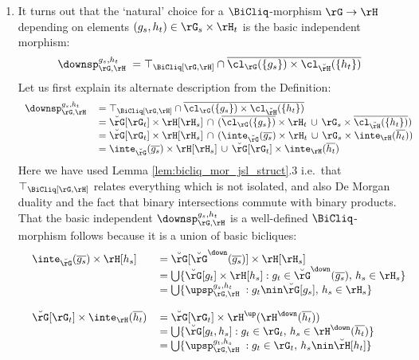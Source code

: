 \documentclass{article}
\begin{document}
\begin{example}
\begin{enumerate}
\item
It turns out that the `natural' choice for a $\BiCliq$-morphism $\rG \to \rH$ depending on elements $(g_s,h_t) \in \rG_s \times \rH_t$ is the basic independent morphism:
\[
\downsp_{\rG,\rH}^{g_s,h_t} \;
= \top_{\BiCliq[\rG,\rH]} \cap \overline{\cl_\rG(\{g_s\}) \times \cl_{\breve{\rH}}(\{h_t\})}
\]
Let us first explain its alternate description from the Definition:
\[
\begin{tabular}{lll}
$\downsp_{\rG,\rH}^{g_s,h_t}$
&
$= \top_{\BiCliq[\rG,\rH]} \cap \overline{\cl_\rG(\{g_s\}) \times \cl_{\breve{\rH}}(\{h_t\})}$
\\&
$= \breve{\rG}[\rG_t] \times \rH[\rH_s] \,\cap\, (\overline{\cl_\rG(\{g_s\})} \times \rH_t \,\cup\, \rG_s \times \overline{\cl_{\breve{\rH}}(\{h_t\})})$
\\&
$= \breve{\rG}[\rG_t] \times \rH[\rH_s] \,\cap\, (\inte_{\breve{\rG}}(\overline{g_s}) \times \rH_t \,\cup\, \rG_s \times \inte_{\rH}(\overline{h_t}))$
\\&
$= \inte_{\breve{\rG}}(\overline{g_s}) \times \rH[\rH_s] \,\cup\, \breve{\rG}[\rG_t] \times \inte_{\rH}(\overline{h_t})$
\end{tabular}
\]
Here we have used Lemma \ref{lem:bicliq_mor_jsl_struct}.3 i.e.\ that $\top_{\BiCliq[\rG,\rH]}$ relates  everything which is not isolated, and also De Morgan duality and the fact that binary intersections commute with binary products. That the basic independent $\downsp_{\rG,\rH}^{g_s,h_t}$ is a well-defined $\BiCliq$-morphism follows because it is a union of basic bicliques:
\[
\begin{tabular}{ll}
\begin{tabular}{ll}
$\inte_{\breve{\rG}}(\overline{g_s}) \times \rH[h_s]$
&
$= \breve{\rG}[\breve{\rG}^\down(\overline{g_s})] \times \rH[\rH_s]$
\\&
$= \bigcup \{ \breve{\rG}[g_t] \times \rH[h_s] : g_t \in \breve{\rG}^\down(\overline{g_s}),\, h_s \in \rH_s \}$
\\&
$= \bigcup \{ \upsp_{\rG,\rH}^{g_s,h_t} \; : g_t \nin \breve{\rG}[g_s] ,\, h_s \in \rH_s \}$
\\
\\
$\breve{\rG}[\rG_t] \times \inte_{\rH}(\overline{h_t})$
&
$= \breve{\rG}[\rG_t] \times \rH^\up(\rH^\down(\overline{h_t}))$
\\&
$= \bigcup \{ \breve{\rG}[g_t,h_s] : g_t \in \rG_t, \, h_s \in \rH^\down(\overline{h_t}) \}$
\\&
$= \bigcup \{ \upsp_{\rG,\rH}^{g_t,h_s} \; : g_t \in \rG_t, \, h_s \nin \breve{\rH}[h_t] \}$

\end{tabular}
\end{tabular}\]
\end{enumerate}
\end{example}
\end{document}
